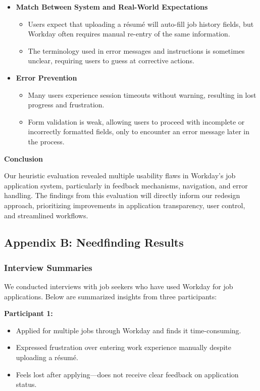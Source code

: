 \documentclass[
	letterpaper, %
]{jdf}
\begin{document}
\begin{sloppypar}
\begin{itemize}
    \item \textbf{Match Between System and Real-World Expectations}  
    \begin{itemize}
        \item Users expect that uploading a résumé will auto-fill job history fields, but Workday often requires manual re-entry of the same information.
        \item The terminology used in error messages and instructions is sometimes unclear, requiring users to guess at corrective actions.
    \end{itemize}

    \item \textbf{Error Prevention}  
    \begin{itemize}
        \item Many users experience session timeouts without warning, resulting in lost progress and frustration.
        \item Form validation is weak, allowing users to proceed with incomplete or incorrectly formatted fields, only to encounter an error message later in the process.
    \end{itemize}
\end{itemize}

\textbf{Conclusion}  

Our heuristic evaluation revealed multiple usability flaws in Workday’s job application system, particularly in feedback mechanisms, navigation, and error handling. The findings from this evaluation will directly inform our redesign approach, prioritizing improvements in application transparency, user control, and streamlined workflows.

\newpage

\subsection{Appendix B: Needfinding Results}

\subsubsection*{Interview Summaries}  

We conducted interviews with job seekers who have used Workday for job applications. Below are summarized insights from three participants:  

\textbf{Participant 1:}  
\begin{itemize}  
    \item Applied for multiple jobs through Workday and finds it time-consuming.  
    \item Expressed frustration over entering work experience manually despite uploading a résumé.  
    \item Feels lost after applying—does not receive clear feedback on application status.  
\end{itemize}  


\end{sloppypar}
\end{document}
